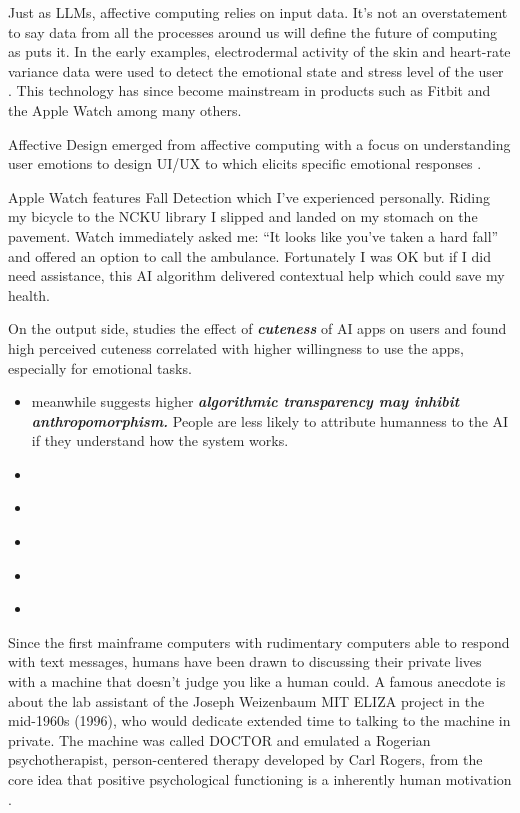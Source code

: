 \documentclass[
  letterpaper,
  DIV=11,
  numbers=noendperiod]{scrartcl}
\providecommand{\tightlist}{%
  \setlength{\itemsep}{0pt}\setlength{\parskip}{0pt}}\usepackage{longtable,booktabs,array}
\begin{document}
Just as LLMs, affective computing relies on input data. It's not an
overstatement to say data from all the processes around us will define
the future of computing as \citet{hiittvWojciechSzpankowskiEmerging2021}
puts it. In the early examples, electrodermal activity of the skin and
heart-rate variance data were used to detect the emotional state and
stress level of the user
\citep{zangronizElectrodermalActivitySensor2017, velmovitskyUsingAppleWatch2022}.
This technology has since become mainstream in products such as Fitbit
and the Apple Watch among many others.

Affective Design emerged from affective computing with a focus on
understanding user emotions to design UI/UX to which elicits specific
emotional responses \citep{Reynolds2001DesigningFA}.

Apple Watch features Fall Detection which I've experienced personally.
Riding my bicycle to the NCKU library I slipped and landed on my stomach
on the pavement. Watch immediately asked me: ``It looks like you've
taken a hard fall'' and offered an option to call the ambulance.
Fortunately I was OK but if I did need assistance, this AI algorithm
delivered contextual help which could save my health.

On the output side, \citet{lvCutenessIrresistibleImpact2022} studies the
effect of \textbf{\emph{cuteness}} of AI apps on users and found high
perceived cuteness correlated with higher willingness to use the apps,
especially for emotional tasks.

\begin{itemize}
\tightlist
\item
  \citet{liuMachineGazeOnline2021} meanwhile suggests higher
  \textbf{\emph{algorithmic transparency may inhibit anthropomorphism.}}
  People are less likely to attribute humanness to the AI if they
  understand how the system works.
\item
  \citet{tedxTechEmotionsRoz2011}
\item
  \citet{lexfridmanRosalindPicardAffective2019}
\item
  \citet{hiittvRosalindPicardAdventures2021}
\item
  \citet{bwhcnocRosalindPicard4th2023}
\item
  \citet{singularityuniversityEngineeringEmotionAI2023}
\end{itemize}

Since the first mainframe computers with rudimentary computers able to
respond with text messages, humans have been drawn to discussing their
private lives with a machine that doesn't judge you like a human could.
A famous anecdote is about the lab assistant of the Joseph Weizenbaum
MIT ELIZA project in the mid-1960s (1996), who would dedicate extended
time to talking to the machine in private. The machine was called DOCTOR
and emulated a Rogerian psychotherapist, person-centered therapy
developed by Carl Rogers, from the core idea that positive psychological
functioning is a inherently human motivation
\citep{bassettComputationalTherapeuticExploring2019, rogersWayBeing1995}.
\end{document}
